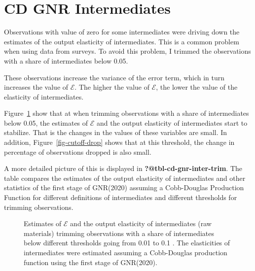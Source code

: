 \documentclass[
  12pt]{article}
\theoremstyle{definition}
\theoremstyle{remark}
\begin{document}
\section{CD GNR Intermediates}\label{cd-gnr-intermediates}

Observations with value of zero for some intermediates were driving down
the estimates of the output elasticity of intermediates. This is a
common problem when using data from surveys. To avoid this problem, I
trimmed the observations with a share of intermediates below 0.05.

These observations increase the variance of the error term, which in
turn increases the value of \(\mathcal{E}\). The higher the value of
\(\mathcal{E}\), the lower the value of the elasticity of intermediates.

Figure~\ref{fig-cutoff} show that at when trimming observations with a
share of intermediates below 0.05, the estimates of \(\mathcal{E}\) and
the output elasticity of intermediates start to stabilize. That is the
changes in the values of these variables are small. In addition,
Figure~\ref{fig-cutoff-drop} shows that at this threshold, the change in
percentage of observations dropped is also small.

A more detailed picture of this is displayed in
\textbf{?@tbl-cd-gnr-inter-trim}. The table compares the estimates of
the output elasticity of intermediates and other statistics of the first
stage of GNR(2020) assuming a Cobb-Douglas Production Function for
different definitions of intermediates and different thresholds for
trimming observations.

\begin{figure}


\caption{\label{fig-cutoff}Estimates of \(\mathcal{E}\) and the output
elasticity of intermediates (raw materials) trimming observations with a
share of intermediates below different thresholds going from 0.01 to 0.1
. The elasticities of intermediates were estimated assuming a
Cobb-Douglas production function using the first stage of GNR(2020).}

\end{figure}%
\end{document}
